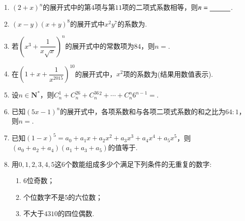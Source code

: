 \documentclass{BHCexam}
\begin{document}
\begin{enumerate}[1.]
\item $ \left(2+x\right)^n $的展开式中的第$ 4 $项与第$ 11 $项的二项式系数相等，则$ n=\underline{\hspace{3em}} $.
\item $ (x-y)(x+y)^8 $的展开式中$ x^2y^7 $的系数为\tk.
\item 若$ \left(x^3+\dfrac{1}{x\sqrt{x}}\right)^n $的展开式中的常数项为$ 84 $，则$ n =$\tk.

\item 在$ \left(1+x+\dfrac{1}{x^{2015}}\right) ^{10}$的展开式中，$ x^2 $项的系数为\tk(结果用数值表示).
\item 设$ n\in \mathbf{N^*} $，则$ C_n^1+C_n^26+C_n^36^2+\cdots+C_n^n6^{n-1} =$\tk.
\item 已知$ \left(5x-1\right)^n $的展开式中，各项系数和与各项二项式系数的和之比为$ 64:1 $，则$ n= $\tk.
\item 已知$ (1-x)^5=a_0+a_1x+a_2x^2+a_3x^3+a_4x^4+a_5x^5 $，则$ (a_0+a_2+a_4)(a_1+a_3+a_5) $的值等于\tk.
\item 用$0,1,2,3,4,5$这$ 6 $个数能组成多少个满足下列条件的无重复的数字:
\begin{enumerate}[(1 )]
\item $ 6 $位奇数；
\item 个位数字不是$ 5 $的六位数；
\item 不大于$4310$的四位偶数.
\end{enumerate}
\end{enumerate}
\end{document}
